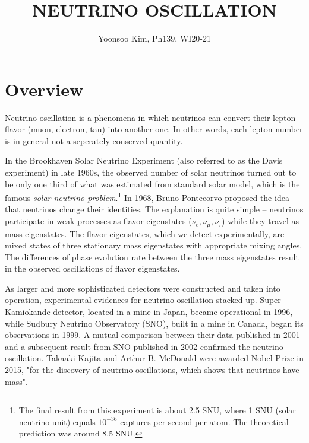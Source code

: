 \documentclass[11pt, oneside]{article}
\title{
    \vspace{-2em}
    {\Large\MakeUppercase{Neutrino oscillation}}
}
\author{
    {\large Yoonsoo Kim, Ph139, WI20-21}
}
\date{}
\begin{document}
\maketitle

\section{Overview}

Neutrino oscillation is a phenomena in which neutrinos can convert their lepton flavor (muon, electron, tau) into another one. In other words, each lepton number is in general not a seperately conserved quantity.

In the Brookhaven Solar Neutrino Experiment (also referred to as the Davis experiment) in late 1960s, the observed number of solar neutrinos turned out to be only one third of what was estimated from standard solar model, which is the famous \emph{solar neutrino problem}.\footnote{The final result from this experiment is about 2.5 \textsf{SNU}, where 1 \textsf{SNU} (solar neutrino unit) equals  $10^{-36}$ captures per second per atom. The theoretical prediction was around 8.5 SNU.} 
In 1968, Bruno Pontecorvo proposed the idea that neutrinos change their identities. The explanation is quite simple -- neutrinos participate in weak processes as flavor eigenstates ($\nu_e, \nu_\mu, \nu_\tau$) while they travel as mass eigenstates. The flavor eigenstates, which we detect experimentally, are mixed states of three stationary mass eigenstates with appropriate mixing angles. The differences of phase evolution rate between the three mass eigenstates result in the observed oscillations of flavor eigenstates.


As larger and more sophisticated detectors were constructed and taken into operation, experimental evidences for neutrino oscillation stacked up. Super-Kamiokande detector, located in a mine in Japan, became operational in 1996, while Sudbury Neutrino Observatory (SNO), built in a mine in Canada, began its observations in 1999. A mutual comparison between their data published in 2001 and a subsequent result from SNO published in 2002 confirmed the neutrino oscillation. Takaaki Kajita and Arthur B. McDonald were awarded Nobel Prize in 2015, "for the discovery of neutrino oscillations, which shows that neutrinos have mass".
\end{document}
